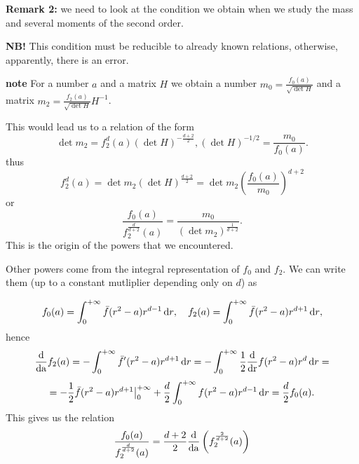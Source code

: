 \textbf{Remark 2:} we need to look at the condition we obtain when we study the mass and several moments of the second order.

\textbf{NB!} This condition must be reducible to already known relations, otherwise, apparently, there is an error.

\textbf{note}
For a number $a$ and a matrix $H$ we obtain a number $m_0=\frac{f_0(a)}{\sqrt{\det H}}$ and a matrix $m_2 = \frac{f_2(a)}{\sqrt{\det H}}H^{-1}$.

This would lead us to a relation of the form
\[
        \det m_2  = f_2^{d}(a)(\det H)^{-\frac{d+2}{2}}, (\det H)^{-1/2} = \frac{m_0}{f_0(a)}.
\]
thus
\[
        f_2^{d}(a) = \det m_2 (\det H)^{\frac{d+2}{2}} = \det m_2 \left( \frac{f_0(a)}{m_0} \right)^{d+2}
\]
or
\[
        \frac{f_0(a)}{f_2^{\frac{d}{d+2}}(a)} = \frac{m_0}{(\det m_2)^{\frac{1}{d+2}}}.
\]
This is the origin %
of the powers that we encountered. 

Other powers come from the integral representation of $f_0$ and $f_2$. We can write them (up to a constant mutliplier depending only on $d$) as

\begin{equation*}
        f_0(a) = \int_{0}^{+\infty} \bar f(r^2-a)r^{d-1}{\,\mathrm dr}, \quad f_2(a) = \int_{0}^{+\infty} \bar f(r^2-a)r^{d+1}{\,\mathrm dr},
\end{equation*}
hence
\begin{equation*}
        \frac{\mathrm d}{\mathrm {d {a}}} f_2(a) = -\int_{0}^{+\infty} \bar f'(r^2-a)r^{d+1}{\,\mathrm dr} = -\int_{0}^{+\infty}\frac{1}{2} \frac{\mathrm d}{\mathrm {d {r}}} f(r^2-a)r^{d}{\,\mathrm dr} =  
\end{equation*}
\begin{equation*}
        =-\frac 12 \bar f(r^2-a)r^{d+1}\big|_0^{+\infty} + \frac d2 \int_{0}^{+\infty}f(r^2-a)r^{d-1}{\,\mathrm dr} = \frac d2 f_0(a).
\end{equation*}
This gives us the relation
\begin{equation*}
        \frac{f_0(a)}{f_2^{\frac{d}{d+2}}(a)} =  \frac{d+2}{2}\frac{\mathrm d}{\mathrm {d {a}}} \left( f_2^{\frac{2}{d+2}}(a) \right)
\end{equation*}

